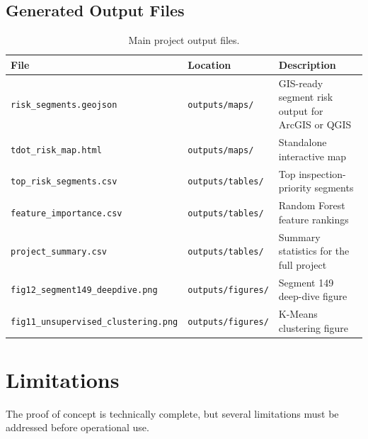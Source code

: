 \documentclass[11pt,letterpaper]{article}
\begin{document}
\subsection{Generated Output Files}

\begin{table}[H]
\centering
\caption{Main project output files.}
\label{tab:outputs}
\begin{tabularx}{\linewidth}{L{6.2cm}L{3.1cm}Y}
\toprule
\textbf{File} &
\textbf{Location} &
\textbf{Description} \\
\midrule
\texttt{risk\_segments.geojson} & \texttt{outputs/maps/} & GIS-ready segment risk output for ArcGIS or QGIS \\
\texttt{tdot\_risk\_map.html} & \texttt{outputs/maps/} & Standalone interactive map \\
\texttt{top\_risk\_segments.csv} & \texttt{outputs/tables/} & Top inspection-priority segments \\
\texttt{feature\_importance.csv} & \texttt{outputs/tables/} & Random Forest feature rankings \\
\texttt{project\_summary.csv} & \texttt{outputs/tables/} & Summary statistics for the full project \\
\texttt{fig12\_segment149\_deepdive.png} & \texttt{outputs/figures/} & Segment 149 deep-dive figure \\
\texttt{fig11\_unsupervised\_clustering.png} & \texttt{outputs/figures/} & K-Means clustering figure \\
\bottomrule
\end{tabularx}
\end{table}

\section{Limitations}
\label{sec:limitations}

The proof of concept is technically complete, but several limitations must be addressed before operational use.
\end{document}
